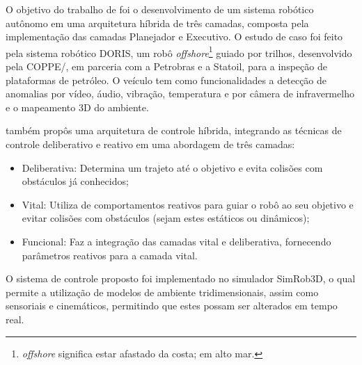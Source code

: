 
O objetivo do trabalho de  foi o desenvolvimento de um sistema robótico autônomo em uma 
arquitetura híbrida de três camadas, composta pela implementação das camadas Planejador e Executivo. 
O estudo de caso foi feito pela sistema robótico DORIS, um robô \textit{offshore}\footnote{\textit{offshore} 
significa estar afastado da costa; em alto mar.} 
guiado por trilhos, desenvolvido pela COPPE/, 
em parceria com a Petrobras e a Statoil, para a inspeção de plataformas de petróleo. O veículo 
tem como funcionalidades a detecção de anomalias por vídeo, áudio, vibração, temperatura e por câmera de infravermelho e o 
mapeamento 3D do ambiente.

 também propôs uma arquitetura de controle híbrida, integrando as técnicas de controle deliberativo e 
reativo em uma abordagem de três camadas: 
\begin{itemize}
 \item Deliberativa: Determina um trajeto até o objetivo e evita colisões com obstáculos já conhecidos;
 \item Vital: Utiliza de comportamentos reativos para guiar o robô ao seu objetivo e evitar colisões com obstáculos (sejam estes 
estáticos ou dinâmicos); 
  \item Funcional: Faz a integração das camadas vital e deliberativa, fornecendo parâmetros reativos para a camada vital.
\end{itemize}
O sistema de controle proposto foi implementado no simulador SimRob3D, o qual permite a utilização de modelos de ambiente 
tridimensionais, assim como sensoriais e cinemáticos, permitindo que estes possam ser alterados em tempo real.

